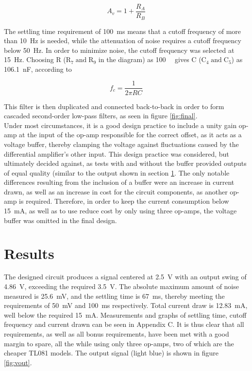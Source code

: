 $${A_v}=1+\frac{{R}_A}{R_B}$$

The settling time requirement of \SI{100}{ms} means that a cutoff frequency of more than \SI{10}{Hz} is needed, while the attenuation of noise requires a cutoff frequency below \SI{50}{Hz}. In order to minimize noise, the cutoff frequency was selected at \SI{15}{Hz}. Choosing R ($\mathrm{R_7 \; and \; R_9}$ in the diagram) as \SI{100}{\kilo\Omega} gives C ($\mathrm{C_4 \; and \; C_5}$) as \SI{106.1}{nF}, according to

$$f_c=\frac{1}{2 \pi RC}$$

This filter is then duplicated and connected back-to-back in order to form cascaded second-order low-pass filters, as seen in figure \ref{fig:final}.\\

Under most circumstances, it is a good design practice to include a unity gain op-amp at the input of the op-amp responsible for the correct offset, as it acts as a voltage buffer, thereby clamping the voltage against fluctuations caused by the differential amplifier's other input. This design practice was considered, but ultimately decided against, as tests with and without the buffer provided outputs of equal quality (similar to the output shown in section \ref{sec:temp_results}. The only notable differences resulting from the inclusion of a buffer were an increase in current drawn, as well as an increase in cost for the circuit components, as another op-amp is required. Therefore, in order to keep the current consumption below \SI{15}{mA}, as well as to use reduce cost by only using three op-amps, the voltage buffer was omitted in the final design. 


\section{Results} \label{sec:temp_results}
The designed circuit produces a signal centered at \SI{2.5}{\volt} with an output swing of \SI{4.86}{\volt}, exceeding the required \SI{3.5}{\volt}. The absolute maximum amount of noise measured is \SI{25.6}{\milli\volt}, and the settling time is \SI{67}{ms}, thereby meeting the requirements of \SI{50}{\milli\volt} and \SI{100}{ms} respectively. Total current draw is \SI{12.83}{mA}, well below the required \SI{15}{mA}. Measurements and graphs of settling time, cutoff frequency and current drawn can be seen in Appendix C. It is thus clear that all requirements, as well as all bonus requirements, have been met with a good margin to spare, all the while using only three op-amps, two of which are the cheaper TL081 models. The output signal (light blue) is shown in figure \ref{fig:vout}.

